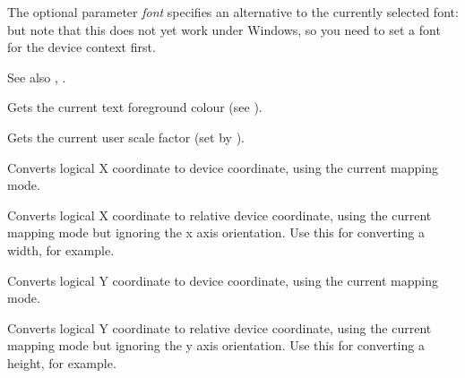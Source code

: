 The optional parameter {\it font} specifies an alternative
to the currently selected font: but note that this does not
yet work under Windows, so you need to set a font for
the device context first.

See also , .

\label{wxsvgfiledcgettextforeground}



Gets the current text foreground colour (see ).


\label{wxsvgfiledcgetuserscale}


Gets the current user scale factor (set by ).

\label{wxsvgfiledclogicaltodevicex}


Converts logical X coordinate to device coordinate, using the current
mapping mode.

\label{wxsvgfiledclogicaltodevicexrel}


Converts logical X coordinate to relative device coordinate, using the current
mapping mode but ignoring the x axis orientation.
Use this for converting a width, for example.

\label{wxsvgfiledclogicaltodevicey}


Converts logical Y coordinate to device coordinate, using the current
mapping mode.

\label{wxsvgfiledclogicaltodeviceyrel}


Converts logical Y coordinate to relative device coordinate, using the current
mapping mode but ignoring the y axis orientation.
Use this for converting a height, for example.

